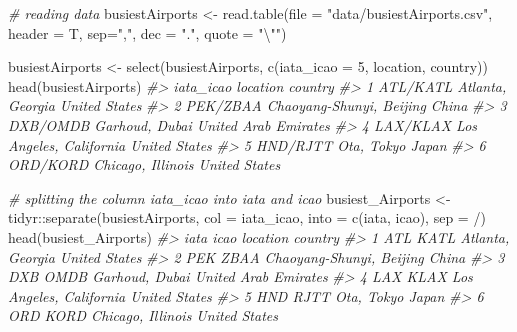 \documentclass[
]{book}
\newenvironment{Shaded}{\begin{snugshade}}{\end{snugshade}}
\newcommand{\AttributeTok}[1]{\textcolor[rgb]{0.77,0.63,0.00}{#1}}
\newcommand{\CommentTok}[1]{\textcolor[rgb]{0.56,0.35,0.01}{\textit{#1}}}
\newcommand{\DecValTok}[1]{\textcolor[rgb]{0.00,0.00,0.81}{#1}}
\newcommand{\FunctionTok}[1]{\textcolor[rgb]{0.00,0.00,0.00}{#1}}
\newcommand{\NormalTok}[1]{#1}
\newcommand{\OtherTok}[1]{\textcolor[rgb]{0.56,0.35,0.01}{#1}}
\newcommand{\SpecialCharTok}[1]{\textcolor[rgb]{0.00,0.00,0.00}{#1}}
\newcommand{\StringTok}[1]{\textcolor[rgb]{0.31,0.60,0.02}{#1}}
\begin{document}
\begin{Shaded}
\begin{Highlighting}[]
\CommentTok{\# reading data}
\NormalTok{busiestAirports }\OtherTok{\textless{}{-}} \FunctionTok{read.table}\NormalTok{(}\AttributeTok{file =} \StringTok{"data/busiestAirports.csv"}\NormalTok{, }
                              \AttributeTok{header =}\NormalTok{ T, }
                              \AttributeTok{sep=}\StringTok{","}\NormalTok{, }
                              \AttributeTok{dec =} \StringTok{"."}\NormalTok{, }
                              \AttributeTok{quote =} \StringTok{"}\SpecialCharTok{\textbackslash{}"}\StringTok{"}\NormalTok{)}

\NormalTok{busiestAirports }\OtherTok{\textless{}{-}} \FunctionTok{select}\NormalTok{(busiestAirports, }\FunctionTok{c}\NormalTok{(}\StringTok{\textquotesingle{}iata\_icao\textquotesingle{}} \OtherTok{=} \DecValTok{5}\NormalTok{, }\StringTok{\textquotesingle{}location\textquotesingle{}}\NormalTok{, }\StringTok{\textquotesingle{}country\textquotesingle{}}\NormalTok{))}
\FunctionTok{head}\NormalTok{(busiestAirports)}
\CommentTok{\#\textgreater{}   iata\_icao                 location              country}
\CommentTok{\#\textgreater{} 1  ATL/KATL         Atlanta, Georgia        United States}
\CommentTok{\#\textgreater{} 2  PEK/ZBAA Chaoyang{-}Shunyi, Beijing                China}
\CommentTok{\#\textgreater{} 3  DXB/OMDB           Garhoud, Dubai United Arab Emirates}
\CommentTok{\#\textgreater{} 4  LAX/KLAX  Los Angeles, California        United States}
\CommentTok{\#\textgreater{} 5  HND/RJTT               Ota, Tokyo                Japan}
\CommentTok{\#\textgreater{} 6  ORD/KORD        Chicago, Illinois        United States}

\CommentTok{\# splitting the column iata\_icao into iata and icao}
\NormalTok{busiest\_Airports }\OtherTok{\textless{}{-}} 
\NormalTok{  tidyr}\SpecialCharTok{::}\FunctionTok{separate}\NormalTok{(busiestAirports, }\AttributeTok{col =} \StringTok{\textquotesingle{}iata\_icao\textquotesingle{}}\NormalTok{, }\AttributeTok{into =} \FunctionTok{c}\NormalTok{(}\StringTok{\textquotesingle{}iata\textquotesingle{}}\NormalTok{, }\StringTok{\textquotesingle{}icao\textquotesingle{}}\NormalTok{), }\AttributeTok{sep =} \StringTok{\textquotesingle{}/\textquotesingle{}}\NormalTok{)}
\FunctionTok{head}\NormalTok{(busiest\_Airports)}
\CommentTok{\#\textgreater{}   iata icao                 location              country}
\CommentTok{\#\textgreater{} 1  ATL KATL         Atlanta, Georgia        United States}
\CommentTok{\#\textgreater{} 2  PEK ZBAA Chaoyang{-}Shunyi, Beijing                China}
\CommentTok{\#\textgreater{} 3  DXB OMDB           Garhoud, Dubai United Arab Emirates}
\CommentTok{\#\textgreater{} 4  LAX KLAX  Los Angeles, California        United States}
\CommentTok{\#\textgreater{} 5  HND RJTT               Ota, Tokyo                Japan}
\CommentTok{\#\textgreater{} 6  ORD KORD        Chicago, Illinois        United States}
\end{Highlighting}
\end{Shaded}
\end{document}
